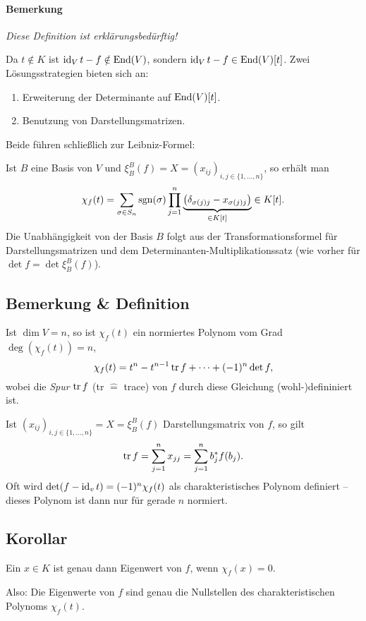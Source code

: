 \paragraph{Bemerkung}
	\emph{Diese Definition ist erklärungsbedürftig!}
	
	Da $ t\notin K $ ist $ \operatorname{id}_Vt-f\notin \operatorname{End}(V) $, sondern $ \operatorname{id}_Vt-f\in\operatorname{End}(V)[t] $. Zwei Lösungsstrategien bieten sich an:
		\begin{enumerate}
			\item Erweiterung der Determinante auf $ \operatorname{End}(V)[t] $.
			\item Benutzung von Darstellungsmatrizen.
		\end{enumerate}
	Beide führen schließlich zur Leibniz-Formel:
	
	Ist $ B $ eine Basis von $ V $ und $ \xi_B^B(f) = X = (x_{ij})_{i,j\in\{1,\dots,n\}}$, so erhält man 
		\[ \chi_f(t)=\sum_{\sigma\in S_n}\operatorname{sgn}(\sigma)\prod_{j=1}^{n}\underset{\in K[t]}{\underbrace{\left(\delta_{\sigma(j)j}-x_{\sigma(j)j}\right)}} \in K[t]. \]
	Die Unabhängigkeit von der Basis $ B $ folgt aus der Transformationsformel für Darstellungsmatrizen und dem Determinanten-Multiplikationssatz (wie vorher für $ \det f = \det \xi_B^B(f) $).


\subsection{Bemerkung \& Definition}
\begin{Definition}[Spur]
	Ist $ \dim V=n $, so ist $ \chi_f(t) $ ein normiertes Polynom vom Grad $ \deg\left(\chi_f(t)\right)=n $,
		\[ \chi_f(t)=t^n-t^{n-1}\operatorname{tr} f + \dots + (-1)^n\det f,\] %
	wobei die \emph{Spur} $ \operatorname{tr} f $ (\glqq tr \grqq $\widehat{=}$ trace) von $ f $ durch diese Gleichung (wohl-)defininiert ist.
\end{Definition}	
	Ist $ (x_{ij})_{i,j\in\{1,\dots,n\}} = X = \xi_B^B(f) $ Darstellungsmatrix von $ f $, so gilt
		\[ \operatorname{tr} f = \sum_{j=1}^{n}x_{jj} = \sum_{j=1}^{n} b_j^*f(b_j). \]
	Oft wird $ \det(f-\operatorname{id}_vt)=(-1)^n\chi_f(t) $ als charakteristisches Polynom definiert -- dieses Polynom ist dann nur für gerade $ n $ normiert.
\subsection{Korollar}
\begin{Korollar}
	Ein $ x\in K $ ist genau dann Eigenwert von $ f $, wenn $ \chi_f(x)=0 $.
	
	Also: Die Eigenwerte von $ f $ sind genau die Nullstellen des charakteristischen Polynoms $ \chi_f(t) $.
\end{Korollar}
